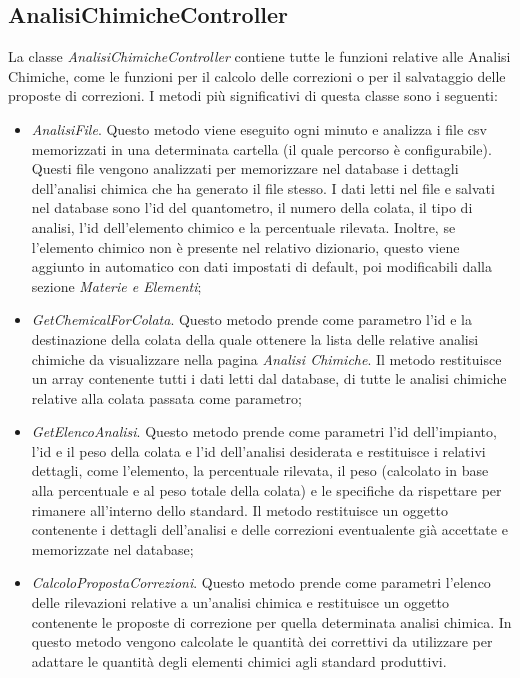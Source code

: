   \subsection{AnalisiChimicheController}
  La classe \textit{AnalisiChimicheController} contiene tutte le funzioni relative alle Analisi Chimiche, come le funzioni per
  il calcolo delle correzioni o per il salvataggio delle proposte di correzioni. I metodi più significativi di questa classe
  sono i seguenti:
  \begin{itemize}
    \item \textit{AnalisiFile}. Questo metodo viene eseguito ogni minuto e analizza i file csv memorizzati in una determinata
    cartella (il quale percorso è configurabile). Questi file vengono analizzati per memorizzare nel database i dettagli
    dell'analisi chimica che ha generato il file stesso. I dati letti nel file e salvati nel database sono
    l'id del quantometro, il numero della colata, il tipo di analisi, l'id dell'elemento chimico e la percentuale rilevata.
    Inoltre, se l'elemento chimico non è presente nel relativo dizionario, questo viene aggiunto in automatico con dati
    impostati di default, poi modificabili dalla sezione \textit{Materie e Elementi};
    \item \textit{GetChemicalForColata}. Questo metodo prende come parametro l'id e la destinazione della colata della
    quale ottenere la lista delle relative analisi chimiche da visualizzare nella pagina \textit{Analisi Chimiche}.
    Il metodo restituisce un array contenente tutti i dati letti dal database, di tutte le analisi chimiche relative alla
    colata passata come parametro;
    \item \textit{GetElencoAnalisi}. Questo metodo prende come parametri l'id dell'impianto, l'id e il peso della colata e
    l'id dell'analisi desiderata e restituisce i relativi dettagli, come l'elemento, la percentuale rilevata, il peso
    (calcolato in base alla percentuale e al peso totale della colata) e le specifiche da rispettare per rimanere
    all'interno dello standard. Il metodo restituisce un oggetto contenente i dettagli dell'analisi e delle
    correzioni eventualente già accettate e memorizzate nel database;
    \item \textit{CalcoloPropostaCorrezioni}. Questo metodo prende come parametri l'elenco delle rilevazioni relative a
    un'analisi chimica e restituisce un oggetto contenente le proposte di correzione per quella determinata analisi chimica.
    In questo metodo vengono calcolate le quantità dei correttivi da utilizzare per adattare le quantità degli
    elementi chimici agli standard produttivi.
  \end{itemize}


